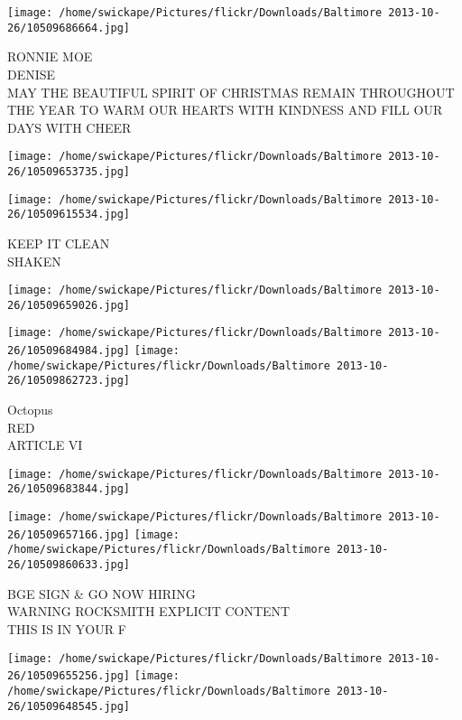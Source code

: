 \documentclass[10pt,letterpaper]{article}
\begin{document}
\vspace{0.25in}
\texttt{[image: /home/swickape/Pictures/flickr/Downloads/Baltimore 2013-10-26/10509686664.jpg]}

RONNIE MOE\\
DENISE\\
MAY THE BEAUTIFUL SPIRIT OF CHRISTMAS REMAIN THROUGHOUT THE YEAR TO WARM OUR HEARTS WITH KINDNESS AND FILL OUR DAYS WITH CHEER\\
\pagebreak

\texttt{[image: /home/swickape/Pictures/flickr/Downloads/Baltimore 2013-10-26/10509653735.jpg]}

\vspace{0.25in}
\texttt{[image: /home/swickape/Pictures/flickr/Downloads/Baltimore 2013-10-26/10509615534.jpg]}

KEEP IT CLEAN\\
SHAKEN\\
\pagebreak

\texttt{[image: /home/swickape/Pictures/flickr/Downloads/Baltimore 2013-10-26/10509659026.jpg]}

\vspace{0.25in}
\texttt{[image: /home/swickape/Pictures/flickr/Downloads/Baltimore 2013-10-26/10509684984.jpg]}
\texttt{[image: /home/swickape/Pictures/flickr/Downloads/Baltimore 2013-10-26/10509862723.jpg]}

Octopus\\
RED\\
ARTICLE VI\\
\pagebreak

\texttt{[image: /home/swickape/Pictures/flickr/Downloads/Baltimore 2013-10-26/10509683844.jpg]}

\vspace{0.25in}
\texttt{[image: /home/swickape/Pictures/flickr/Downloads/Baltimore 2013-10-26/10509657166.jpg]}
\texttt{[image: /home/swickape/Pictures/flickr/Downloads/Baltimore 2013-10-26/10509860633.jpg]}

BGE SIGN \& GO NOW HIRING\\
WARNING ROCKSMITH EXPLICIT CONTENT\\
THIS IS IN YOUR F\\
\pagebreak

\texttt{[image: /home/swickape/Pictures/flickr/Downloads/Baltimore 2013-10-26/10509655256.jpg]}
\texttt{[image: /home/swickape/Pictures/flickr/Downloads/Baltimore 2013-10-26/10509648545.jpg]}
\end{document}
